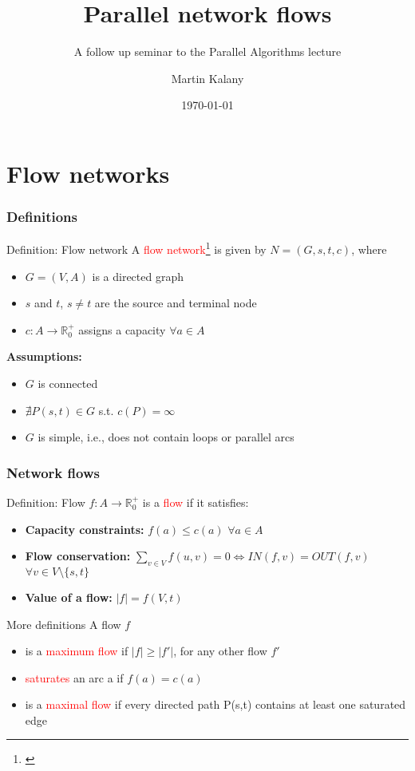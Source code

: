 \documentclass{beamer}
\title{Parallel network flows}
\subtitle{A follow up seminar to the Parallel Algorithms lecture}
\author{Martin Kalany\inst{1} }
\institute
{
  \inst{1}
  Graduate student in Computer Science\\
  Vienna University of Technology\\
}
\date{\today}
\begin{document}

\frame{\titlepage}
	
\section{Flow networks}
\begin{frame}
	\frametitle{Definitions}
    \begin{block}{Definition: Flow network}
    A \textcolor{red}{flow network}\footnote{\cite{ahuja93}}  is given by $N = (G,s,t,c)$, where
    \begin{itemize}
    		\item $G =(V,A)$ is a directed graph
    		\item $s$ and $t$, $s \neq t$ are the source and terminal node
    		\item $c:A\rightarrow \mathbb{R}_0^{+}$ assigns a capacity $\forall a \in A$
    \end{itemize}
    \end{block}
    \textbf{Assumptions:}
	\begin{itemize}
		\item $G$ is connected
		\item $\nexists P(s,t) \in G$ s.t. $c(P) = \infty$
		\item $G$ is simple, i.e., does not contain loops or parallel arcs
	\end{itemize}
\end{frame}
  
\begin{frame}[shrink]
	\frametitle{Network flows}
	\begin{block}{Definition: Flow}
	$f:A \rightarrow \mathbb{R}_0^{+}$ is a \textcolor{red}{flow} if it satisfies:
	\begin{itemize}
		\item \textbf{Capacity constraints:} $f(a) \leq c(a)$ $\forall a \in A$
		\item \textbf{Flow conservation:} 
		$ \sum\limits_{v \in V} f(u,v) =  0 \Leftrightarrow IN(f,v) = OUT(f,v)$ $\forall v \in V \setminus \{s,t\}$
		\item \textbf{Value of a flow:} $\lvert f\rvert = f(V,t)$ 
	\end{itemize}
	\end{block}
	
	\begin{block}{More definitions }
	A flow $f$	
	\begin{itemize}
		\item is a \textcolor{red}{maximum flow} if $\lvert f\rvert \geq \lvert f'\rvert$, for any other flow $f'$
		\item \textcolor{red}{saturates} an arc a if $f(a) = c(a)$
		\item is a \textcolor{red}{maximal flow} if every directed path P(s,t) contains at least one saturated edge
	\end{itemize}
	\end{block}
\end{frame}
\end{document}
